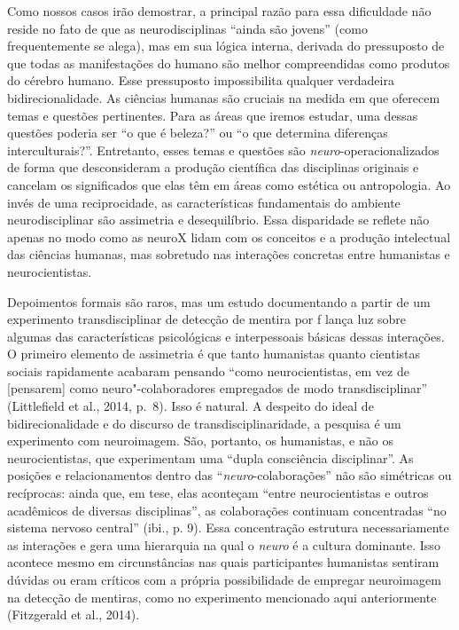 Como nossos casos irão demostrar, a principal razão para essa
dificuldade não reside no fato de que as neurodisciplinas ``ainda são
jovens'' (como frequentemente se alega), mas em sua lógica interna,
derivada do pressuposto de que todas as manifestações do humano são
melhor compreendidas como produtos do cérebro humano. Esse pressuposto
impossibilita qualquer verdadeira bidirecionalidade. As ciências humanas
são cruciais na medida em que oferecem temas e questões pertinentes.
Para as áreas que iremos estudar, uma dessas questões poderia ser ``o
que é beleza?'' ou ``o que determina diferenças interculturais?''.
Entretanto, esses temas e questões são \emph{neuro}-operacionalizados de
forma que desconsideram a produção científica das disciplinas originais
e cancelam os significados que elas têm em áreas como estética ou
antropologia. Ao invés de uma reciprocidade, as características
fundamentais do ambiente neurodisciplinar são assimetria e
desequilíbrio. Essa disparidade se reflete não apenas no modo como as
neuroX lidam com os conceitos e a produção intelectual das ciências
humanas, mas sobretudo nas interações concretas entre humanistas e
neurocientistas.

Depoimentos formais são raros, mas um estudo documentando a partir de um
experimento transdisciplinar de detecção de mentira por f lança luz
sobre algumas das características psicológicas e interpessoais básicas
dessas interações. O primeiro elemento de assimetria é que tanto
humanistas quanto cientistas sociais rapidamente acabaram pensando
``como neurocientistas, em vez de {[}pensarem{]} como
neuro"-colaboradores empregados de modo transdisciplinar'' (Littlefield
et al., 2014, p.~8). Isso é natural. A despeito do ideal de
bidirecionalidade e do discurso de transdisciplinaridade, a pesquisa é
um experimento com neuroimagem. São, portanto, os humanistas, e não os
neurocientistas, que experimentam uma ``dupla consciência disciplinar''.
As posições e relacionamentos dentro das ``\emph{neuro}-colaborações''
não são simétricas ou recíprocas: ainda que, em tese, elas aconteçam
``entre neurocientistas e outros acadêmicos de diversas disciplinas'',
as colaborações continuam concentradas ``no sistema nervoso central''
(ibi., p. 9). Essa concentração estrutura necessariamente as interações
e gera uma hierarquia na qual o \emph{neuro} é a cultura dominante. Isso
acontece mesmo em circunstâncias nas quais participantes humanistas
sentiram dúvidas ou eram críticos com a própria possibilidade de
empregar neuroimagem na detecção de mentiras, como no experimento
mencionado aqui anteriormente (Fitzgerald et al., 2014).

